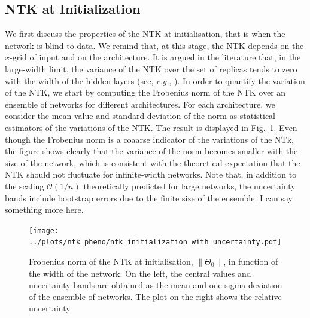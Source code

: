 \subsection{NTK at Initialization}
\label{sec:NTKAtInit}
We first discuss the properties of the NTK at initialisation, that is when the
network is blind to data. We remind that, at this stage, the NTK depends on the
$x$-grid of input and on the architecture. It is argued in the literature that,
in the large-width limit, the variance of the NTK over the set of replicas tends to zero 
with the width of the hidden layers (see, \textit{e.g.}, \cite{Roberts:2021fes}). In order to
quantify the variation of the NTK, we start by computing the Frobenius norm of the NTK over
an ensemble of networks for different architectures. For each architecture, we
consider the mean value and standard deviation of the norm as statistical estimators of the
variations of the NTK. The result is displayed in Fig.~\ref{fig:NTKInit}. Even though the 
Frobenius norm is a coaarse indicator of the variations of the NTk,
the figure shows clearly that the variance of the norm becomes smaller with the size of the
network, which is consistent with the theoretical expectation that the NTK should not 
fluctuate for infinite-width networks. Note that, in addition to the scaling $\mathcal{O}(1/n)$ theoretically
predicted for large networks, the uncertainty bands include bootstrap errors
due to the finite size of the ensemble. \ac{I can say something more here.}

\begin{figure}[ht!]
  \centering
  \texttt{[image: ../plots/ntk\_pheno/ntk\_initialization\_with\_uncertainty.pdf]}
  \caption{Frobenius norm of the NTK at initialisation, $\lVert \Theta_0
  \rVert$, in function of the width of the network. On the left, the central values
  and uncertainty bands are obtained as the mean and one-sigma deviation of the
  ensemble of networks. The plot on the right shows the relative uncertainty }
  \label{fig:NTKInit}
\end{figure}

